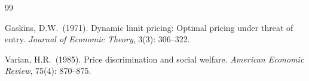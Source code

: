 \documentclass[12pt]{article}
\theoremstyle{plain}
\theoremstyle{definition}
\theoremstyle{remark}
\begin{document}
\begin{thebibliography}{99}

Gaskins, D.W.\ (1971).
\newblock Dynamic limit pricing: Optimal pricing under threat of entry.
\newblock \emph{Journal of Economic Theory}, 3(3): 306--322.

Varian, H.R.\ (1985).
\newblock Price discrimination and social welfare.
\newblock \emph{American Economic Review}, 75(4): 870--875.

\end{thebibliography}
\end{document}
